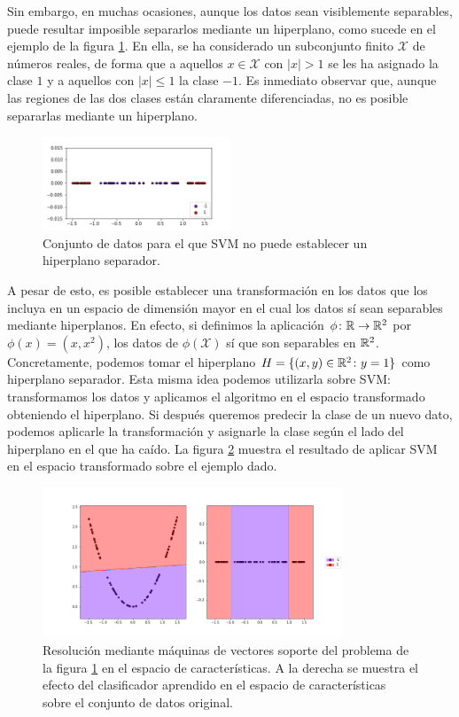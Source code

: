 \documentclass{book}
\begin{document}
Sin embargo, en muchas ocasiones, aunque los datos sean visiblemente separables, puede resultar imposible separarlos mediante un hiperplano, como sucede en el ejemplo de la figura \ref{fig:svm_ejemplo2}. En ella, se ha considerado un subconjunto finito $\mathcal{X}$ de números reales, de forma que a aquellos $x \in \mathcal{X}$ con $|x| > 1$ se les ha asignado la clase $1$ y a aquellos con $|x| \le 1$ la clase $-1$. Es inmediato observar que, aunque las regiones de las dos clases están claramente diferenciadas, no es posible separarlas mediante un hiperplano.

\begin{figure}[h]
	\centering
	\includegraphics[width=0.5\textwidth]{images/svm_problem.png}
	\caption{Conjunto de datos para el que SVM no puede establecer un hiperplano separador.} \label{fig:svm_ejemplo2}
\end{figure} 

A pesar de esto, es posible establecer una transformación en los datos que los incluya en un espacio de dimensión mayor en el cual los datos sí sean separables mediante hiperplanos. En efecto, si definimos la aplicación $\phi\colon \mathbb{R} \to \mathbb{R}^2$ por $\phi(x) = (x,x^2)$, los datos de $\phi(\mathcal{X})$ sí que son separables en $\mathbb{R}^2$. Concretamente, podemos tomar el hiperplano $H = \{(x,y) \in \mathbb{R}^2 \colon y = 1\}$ como hiperplano separador. Esta misma idea podemos utilizarla sobre SVM: transformamos los datos y aplicamos el algoritmo en el espacio transformado obteniendo el hiperplano. Si después queremos predecir la clase de un nuevo dato, podemos aplicarle la transformación y asignarle la clase según el lado del hiperplano en el que ha caído. La figura \ref{fig:svm_ejemplo3} muestra el resultado de aplicar SVM en el espacio transformado sobre el ejemplo dado.

\begin{figure}[h]
	\includegraphics[width=0.8\textwidth]{images/svm_solution.png}
	\centering
	\caption{Resolución mediante máquinas de vectores soporte del problema de la figura \ref{fig:svm_ejemplo2} en el espacio de características. A la derecha se muestra el efecto del clasificador aprendido en el espacio de características sobre el conjunto de datos original.} \label{fig:svm_ejemplo3}
\end{figure} 
\end{document}
